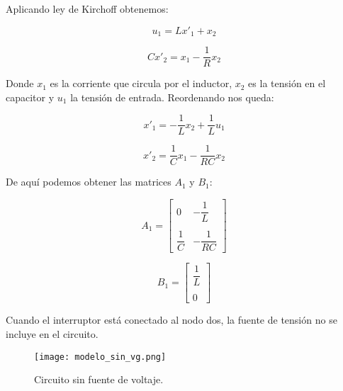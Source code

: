 Aplicando ley de Kirchoff obtenemos:

\vspace{-0.5cm}
\begin{equation}
    u_1 = Lx'_1 + x_2
\end{equation}

\vspace{-0.5cm}
\begin{equation}
    Cx'_2 = x_1 - \dfrac{1}{R} x_2 
\end{equation}

Donde $x_1$ es la corriente que circula por el inductor, $x_2$ es la tensión en el capacitor y $u_1$ la tensión de entrada.
Reordenando nos queda:

\vspace{-0.5cm}
\begin{equation}
    x'_1 = -\dfrac{1}{L} x_2 + \dfrac{1}{L} u_1
\end{equation}

\vspace{-0.5cm}
\begin{equation}
    x'_2 = \dfrac{1}{C}x_1 - \dfrac{1}{RC} x_2 
\end{equation}

De aquí podemos obtener las matrices $A_1$ y $B_1$:

\begin{equation}
    A_1 = \begin{bmatrix}
        0 & -\dfrac{1}{L}\\
        \\
        \dfrac{1}{C} & -\dfrac{1}{RC}
    \end{bmatrix}
\end{equation}

\vspace{-0.5cm}
\begin{equation}
    B_1 = \begin{bmatrix}
        \dfrac{1}{L}\\
        \\
        0
    \end{bmatrix}
\end{equation}

Cuando el interruptor está conectado al nodo dos, la fuente de tensión 
no se incluye en el circuito.

\begin{figure}[H]
    \centering
    \texttt{[image: modelo\_sin\_vg.png]}
    \vspace{-0.25cm}
    \caption{Circuito sin fuente de voltaje.}
    \label{fig:modelado_sin_vg}
\end{figure}

